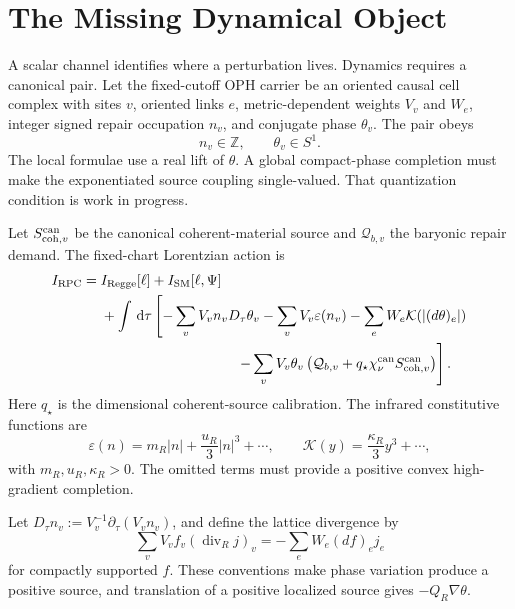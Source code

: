 \documentclass[11pt]{article}
\newcommand{\RPC}{\mathrm{RPC}}
\newcommand{\chican}{\chi_\nu^{\mathrm{can}}}
\newcommand{\dd}{\,\mathrm d}
\begin{document}
\tableofcontents

\section{The Missing Dynamical Object}

A scalar channel identifies where a perturbation lives. Dynamics requires a
canonical pair. Let the fixed-cutoff OPH carrier be an oriented causal cell
complex with sites \(v\), oriented links \(e\), metric-dependent weights
\(V_v\) and \(W_e\), integer signed repair occupation \(n_v\), and conjugate
phase \(\theta_v\). The pair obeys
\begin{equation}
n_v\in\mathbb Z,
\qquad
\theta_v\in S^1.
\end{equation}
The local formulae use a real lift of \(\theta\). A global compact-phase
completion must make the exponentiated source coupling single-valued. That
quantization condition is work in progress.

Let \(S_{{\rm coh},v}^{\rm can}\) be the canonical coherent-material source
and \(\mathcal Q_{b,v}\) the baryonic repair demand. The fixed-chart
Lorentzian action is
\begin{align}
I_{\RPC}={}&I_{\rm Regge}[\ell]+I_{\rm SM}[\ell,\Psi]
\nonumber\\
&+\int\dd\tau\left[
-\sum_v V_v n_vD_\tau\theta_v
-\sum_vV_v\varepsilon(n_v)
-\sum_eW_e\mathcal K\!\left(|(d\theta)_e|\right)
\right.\nonumber\\
&\hspace{34mm}\left.
-\sum_vV_v\theta_v
\left(\mathcal Q_{b,v}+q_\star\chican
S_{{\rm coh},v}^{\rm can}\right)
\right].
\label{eq:rpc-action}
\end{align}
Here \(q_\star\) is the dimensional coherent-source calibration. The
infrared constitutive functions are
\begin{equation}
\varepsilon(n)=m_R|n|+\frac{u_R}{3}|n|^3+\cdots,
\qquad
\mathcal K(y)=\frac{\kappa_R}{3}y^3+\cdots,
\label{eq:constitutive}
\end{equation}
with \(m_R,u_R,\kappa_R>0\). The omitted terms must provide a positive convex
high-gradient completion.

Let \(D_\tau n_v:=V_v^{-1}\partial_\tau(V_vn_v)\), and define the lattice
divergence by
\begin{equation}
\sum_vV_v f_v(\operatorname{div}_R j)_v
=-\sum_eW_e(df)_ej_e
\label{eq:divergence-convention}
\end{equation}
for compactly supported \(f\). These conventions make phase variation produce
a positive source, and translation of a positive localized source gives
\(-Q_R\nabla\theta\).
\end{document}
